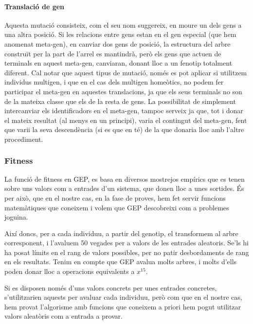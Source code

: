 \paragraph{Translació de gen} %
\label{par:Translacio de gen}

Aquesta mutació consisteix, com el seu nom suggereix, en moure un dels gens a una
altra posició.  Si les relacions entre gens estan en el gen especial (que hem
anomenat meta-gen), en canviar dos gens de posició, la estructura del arbre
construït per la part de l'arrel es mantindrà, però els gens que actuen de
terminals en aquest meta-gen, canviaran, donant lloc a un fenotip totalment
diferent.  Cal notar que aquest tipus de mutació, només es pot aplicar si
utilitzem individus multigen, i que en el cas dels multigen homeòtics, no podem
fer participar el meta-gen en aquestes translacions, ja que els seus terminals no
son de la mateixa classe que els de la resta de gens.  La possibilitat de
simplement intercanviar els identificadors en el meta-gen, tampoc serveix ja
que, tot i donar el mateix resultat (al menys en un principi), varia el
contingut del meta-gen, fent que varii la seva descendència (si es que en té) de
la que donaria lloc amb l'altre procediment.

\subsubsection{Fitness} %
\label{ssub:Fitness}
La funció de fitness en GEP, es basa en diversos mostrejos empírics que es tenen
sobre uns valors com a entrades d'un sistema, que donen lloc a unes sortides.
És per això, que en el nostre cas, en la fase de proves, hem fet servir funcions
matemàtiques que coneixem i volem que GEP descobreixi com a problemes joguina.

Així doncs, per a cada individuu, a partir del genotip, el transformem al arbre
corresponent, i l'avaluem 50 vegades per a valors de les entrades aleatoris.
Se'ls hi ha posat límits en el rang de valors possibles, per no patir
desbordaments de rang en els resultats.  Tenim en compte que GEP avalua molts
arbres, i molts d'ells poden donar lloc a operacions equivalents a $x^{15}$.

Si es disposen només d'uns valors concrets per unes entrades concretes,
s'utilitzarien aquests per avaluar cada individuu, però com que en el nostre
cas, hem provat l'algorisme amb funcions que coneixem a priori hem pogut
utilitzar valors aleatòris com a entrada a provar.

